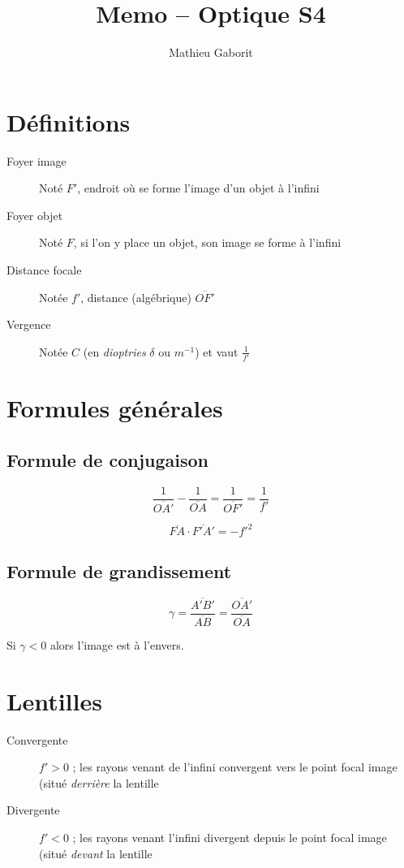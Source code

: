 \documentclass[a4paper, 11pt]{article}
\title{Memo -- Optique S4}
\author{Mathieu Gaborit}
\renewcommand{\bar}{\overline}
\begin{document}
	\maketitle

\section{Définitions}

\begin{description}
    \item[Foyer image] Noté $F'$, endroit où se forme l'image d'un objet à l'infini
    \item[Foyer objet] Noté $F$, si l'on y place un objet, son image se forme à l'infini
    \item[Distance focale] Notée $f'$, distance (algébrique) $\bar{OF'}$
    \item[Vergence] Notée $C$ (en \textit{dioptries} $\delta$ ou $m^{-1}$) et vaut $\frac{1}{f'}$
\end{description}

\section{Formules générales}

\subsection{Formule de conjugaison}

$$\frac{1}{\bar{OA'}} - \frac{1}{\bar{OA}} = \frac{1}{\bar{OF'}} = \frac{1}{f'}$$

$$\bar{FA}\cdot\bar{F'A'} = -f'^2$$

\subsection{Formule de grandissement}

$$\gamma = \frac{\bar{A'B'}}{\bar{AB}} = \frac{\bar{OA'}}{\bar{OA}}$$

Si $\gamma < 0$ alors l'image est à l'envers.

\section{Lentilles}

\begin{description}
    \item[Convergente] $f' > 0$ ; les rayons venant de l'infini convergent vers le point focal image (situé
        \textit{derrière} la lentille
    \item[Divergente] $f' < 0$ ; les rayons venant l'infini divergent depuis le point focal image (situé \textit{devant}
        la lentille
\end{description}
\end{document}
